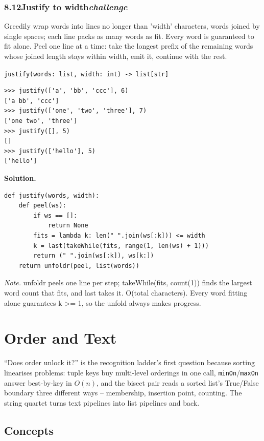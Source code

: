 \documentclass[10pt,letterpaper]{book}
\begin{document}
\subsection*{8.12\quad Justify to width\hfill\textnormal{\textit{challenge}}}
Greedily wrap words into lines no longer than 'width' characters, words joined by single spaces; each line packs as many words as fit. Every word is guaranteed to fit alone. Peel one line at a time: take the longest prefix of the remaining words whose joined length stays within width, emit it, continue with the rest.

\noindent\texttt{justify(words: list, width: int) -> list[str]}
\begin{lstlisting}[style=ex]
>>> justify(['a', 'bb', 'ccc'], 6)
['a bb', 'ccc']
>>> justify(['one', 'two', 'three'], 7)
['one two', 'three']
>>> justify([], 5)
[]
>>> justify(['hello'], 5)
['hello']
\end{lstlisting}
\noindent\textbf{Solution.}
\begin{lstlisting}[style=code]
def justify(words, width):
    def peel(ws):
        if ws == []:
            return None
        fits = lambda k: len(" ".join(ws[:k])) <= width
        k = last(takeWhile(fits, range(1, len(ws) + 1)))
        return (" ".join(ws[:k]), ws[k:])
    return unfoldr(peel, list(words))
\end{lstlisting}
\noindent\textit{Note.} unfoldr peels one line per step; takeWhile(fits, count(1)) finds the largest word count that fits, and last takes it. O(total characters). Every word fitting alone guarantees k >= 1, so the unfold always makes progress.


\clearpage
\chapter{Order and Text}

``Does order unlock it?'' is the recognition ladder's first question because
sorting linearises problems: tuple keys buy multi-level orderings in one
call, \texttt{minOn}/\texttt{maxOn} answer best-by-key in $O(n)$, and the
bisect pair reads a sorted list's True/False boundary three different ways
-- membership, insertion point, counting. The string quartet turns text
pipelines into list pipelines and back.
\section{Concepts}
\end{document}
